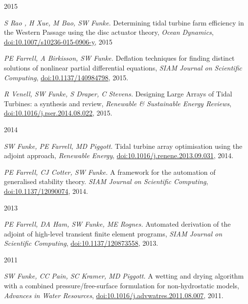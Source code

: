 \documentclass[11pt]{article}
\begin{document}
2015
\begin{etaremune}
\setcounter{enumi}{8}
    \item \textit{S Rao , H Xue, M Bao, SW Funke.} Determining tidal turbine farm efficiency in the Western Passage using the disc actuator theory, \textit{Ocean Dynamics}, \href{https://doi.org/10.1007/s10236-015-0906-y}{doi:10.1007/s10236-015-0906-y}, 2015
\item \textit{PE Farrell, A Birkisson, SW Funke.} Deflation techniques for finding distinct solutions of nonlinear partial differential equations, \textit{SIAM Journal on Scientific Computing}, \href{https://doi.org/10.1137/140984798}{doi:10.1137/140984798}, 2015.
\item \textit{R Venell, SW Funke, S Draper, C Stevens.} Designing Large Arrays of Tidal Turbines: a synthesis and review, \textit{Renewable \& Sustainable Energy Reviews}, \href{https://doi.org/10.1016/j.rser.2014.08.022}{doi:10.1016/j.rser.2014.08.022}, 2015.
\end{etaremune}
2014
\begin{etaremune}
\setcounter{enumi}{5}
\item \textit{SW Funke, PE Farrell, MD Piggott.} Tidal turbine array optimisation using the adjoint approach, \textit{Renewable Energy}, \href{https://doi.org/10.1016/j.renene.2013.09.031}{doi:10.1016/j.renene.2013.09.031}, 2014.
\item \textit{PE Farrell, CJ Cotter, SW Funke.} A framework for the automation of generalised stability theory. \textit{SIAM Journal on     Scientific Computing}, \href{https://doi.org/10.1016/10.1137/12090074}{doi:10.1137/12090074}, 2014.
\end{etaremune}
2013
\begin{etaremune}
\setcounter{enumi}{3}
\item \textit{PE Farrell, DA Ham, SW Funke, ME Rognes.} Automated derivation of the adjoint of high-level transient finite element programs, \textit{SIAM Journal on Scientific Computing}, \href{https://doi.org/10.1016/10.1137/120873558}{doi:10.1137/120873558}, 2013.
\end{etaremune}
2011
\begin{etaremune}
\item \textit{SW Funke, CC Pain, SC Kramer, MD Piggott.} A wetting and drying algorithm with a combined pressure/free-surface formulation for non-hydrostatic models, \textit{Advances in Water Resources}, \href{https://doi.org/10.1016/j.advwatres.2011.08.007}{doi:10.1016/j.advwatres.2011.08.007}, 2011.
\end{etaremune}
\end{document}
